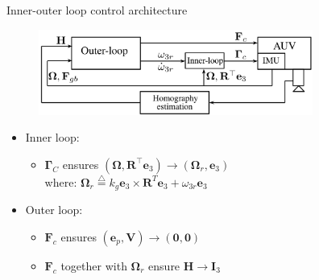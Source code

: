 \documentclass{beamer}
\begin{document}
\begin{frame}{Inner-outer loop control architecture}
\begin{figure}
	\includegraphics[width = 90mm]{Images/Block_diagram_2.png}
\end{figure}


\begin{itemize}
	\item Inner loop:
	\begin{itemize}
	
		\item $\mathbf{\Gamma}_C$ ensures  
		$(\mathbf{\Omega}, \mathbf{R}^\top \mathbf{e}_3) \longrightarrow (\mathbf{\Omega}_r, \mathbf{e}_3)$\\
		where: $ \mathbf{\Omega}_r \stackrel{\triangle}{=}  k_g \mathbf{e}_3 \times \mathbf{R}^{T} \mathbf{e}_3 + \omega_{3r} \mathbf{e}_3$ 
	\end{itemize} 
	\item Outer loop:
		\begin{itemize}
			\item $\mathbf{F}_c$ ensures $(\mathbf{e}_p, \mathbf{V}) \longrightarrow (\mathbf{0},\mathbf{0})$
			\item $\mathbf{F}_c$ together with $\mathbf{\Omega}_{r}$ ensure $\mathbf{H} \longrightarrow \mathbf{I}_3$		
		\end{itemize}
\end{itemize}
\end{frame}
\end{document}
